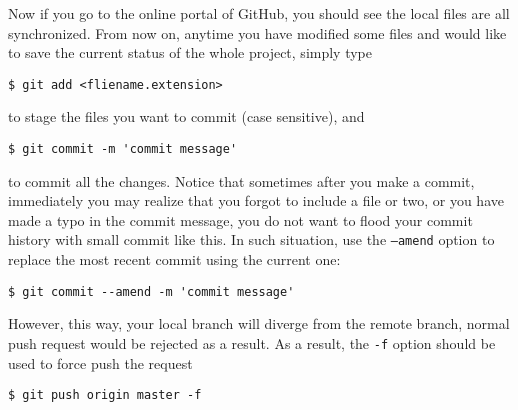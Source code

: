 \documentclass[twoside,11pt,leqno]{article}
\newcommand{\code}{\texttt}
\begin{document}
Now if you go to the online portal of GitHub, you should see the local files are all synchronized. From now on, anytime you have modified some files and would like to save the current status of the whole project, simply type
\begin{verbatim}
$ git add <fliename.extension>
\end{verbatim}
to stage the files you want to commit (case sensitive), and
\begin{verbatim}
$ git commit -m 'commit message'
\end{verbatim}
to commit all the changes. Notice that sometimes after you make a commit, immediately you may realize that you forgot to include a file or two, or you have made a typo in the commit message, you do not want to flood your commit history with small commit like this. In such situation, use the \code{--amend} option to replace the most recent commit using the current one:
\begin{verbatim}
$ git commit --amend -m 'commit message'
\end{verbatim}
However, this way, your local branch will diverge from the remote branch, normal push request would be rejected as a result. As a result, the \code{-f} option should be used to force push the request
\begin{verbatim}
$ git push origin master -f
\end{verbatim}



\end{document}
